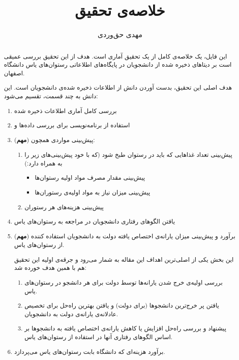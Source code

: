\documentclass{article}
\title{خلاصه‌ی تحقیق}
\author{مهدی حق‌وردی}
\begin{document}
\newcommand{\important}{{\tiny (\textbf{مهم}) }}
\maketitle
\newpage

\tableofcontents
\newpage

	\begin{abstract}
	این فایل،‌ یک خلاصه‌ی کامل از یک تحقیق آماری است. هدف از این تحقیق بررسی عمیقی است بر دیتا‌های ذخیره‌ شده‌ از دانشجویان در پایگاه‌‌های اطلاعاتی رستوان‌های یاس دانشگاه اصفهان.
	
	هدف اصلی این تحقیق،‌ بدست آوردن دانش از اطلاعات ذخیره‌ شده‌ی دانشجویان است. این دانش به چند قسمت، تقسیم می‌شود:
	\begin{enumerate}
		\item 
		بررسی کامل آماری اطلاعات ذخیره شده
		\item
		 استفاده از برنامه‌نویسی برای بررسی داده‌ها و 
		\item \important
		 پیش‌بینی مواردی همچون:
		\begin{enumerate}
			\item
			پیش‌بینی تعداد‌ غذا‌هایی که باید در رستوان طبخ شود (که با خود پیش‌بینی‌های زیر را به همراه دارد:)
			\begin{itemize}
			    \item 
			    پیش‌بینی مقدار مصرف مواد اولیه‌ رستوان‌ها
			    \item 
			    پیش‌بینی میزان نیاز به مواد اولیه‌ی رستوران‌‌ها
			\end{itemize}
		    \item 
		    پیش‌بینی هزینه‌های هر رستوران
		\end{enumerate}
	    \item یافتن الگو‌های رفتاری دانشجویان در مراجعه به رستوان‌‌های یاس
		\item \important
			برآورد و پیش‌بینی میزان یارانه‌ی اختصاص یافته‌ دولت به دانشجویان استفاده کننده از رستوان‌های یاس.
			
			این بخش یکی از اصلی‌ترین اهداف این مقاله به شمار می‌رود و جرقه‌ی اولیه این تحقیق هم با همین هدف خورده‌ شد:
		\begin{enumerate}
			\item 
			بررسی اولیه‌ی خرج‌ شدن یارانه‌ها توسط دولت برای هر دانشجو در رستوان‌های یاس.
			\item 
			یافتن پر خرج‌ترین دانشجو‌ها (برای دولت) و یافتن بهترین راه‌حل برای تخصیص  عادلانه‌ی یارانه‌ی دولت به دانشجویان.
			\item 
			پیشنهاد و بررسی راه‌حل افزایش یا کاهش یارانه‌ی اختصاص یافته به دانشجو‌ها بر اساس الگو‌های رفتاری آنها در استفاده از رستوان‌های یاس.
		\end{enumerate}
	    \item 
	    برآورد هزینه‌ای که دانشگاه بابت رستوان‌های یاس می‌پردازد.
	\end{enumerate}
	\end{abstract}
	\newpage
\end{document}
